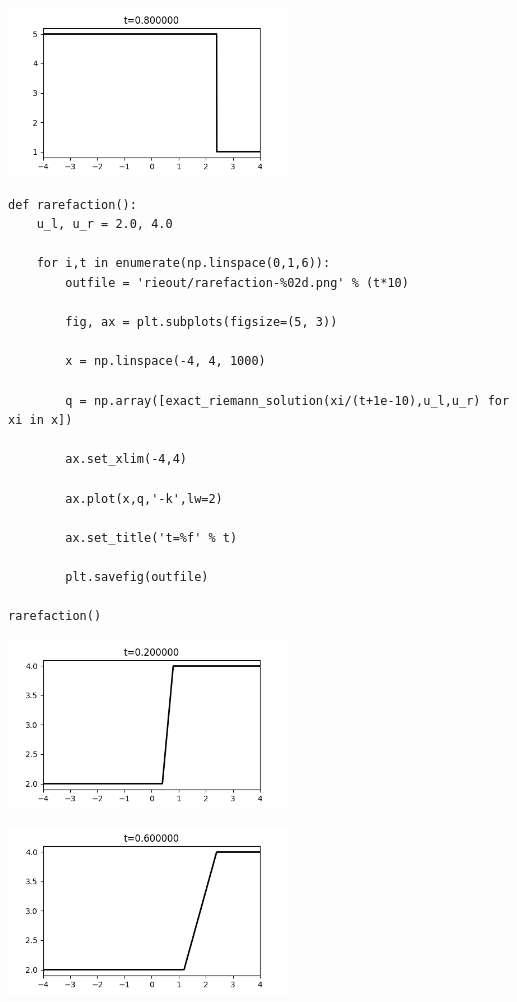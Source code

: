\documentclass[12pt,fleqn]{article}\usepackage{../../common}
\begin{document}
\includegraphics[width=20em]{rieout/shock-04.png}


\begin{verbatim}        
def rarefaction():
    u_l, u_r = 2.0, 4.0
    
    for i,t in enumerate(np.linspace(0,1,6)):
        outfile = 'rieout/rarefaction-%02d.png' % (t*10)

        fig, ax = plt.subplots(figsize=(5, 3))
                    
        x = np.linspace(-4, 4, 1000)
        
        q = np.array([exact_riemann_solution(xi/(t+1e-10),u_l,u_r) for xi in x])

        ax.set_xlim(-4,4)

        ax.plot(x,q,'-k',lw=2)
    
        ax.set_title('t=%f' % t)

        plt.savefig(outfile)

rarefaction()
\end{verbatim}


\includegraphics[width=20em]{rieout/rarefaction-02.png}

\includegraphics[width=20em]{rieout/rarefaction-06.png}
\end{document}
